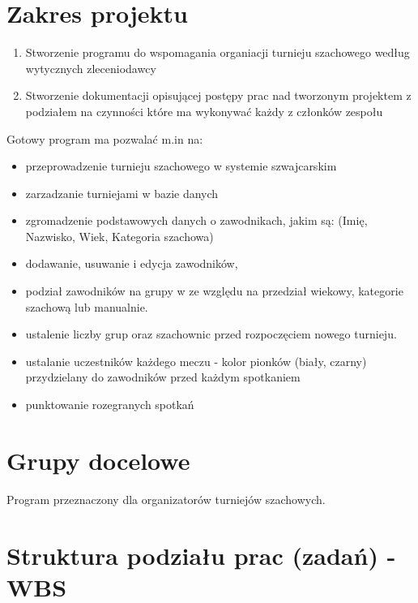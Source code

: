 \section{Zakres projektu}
\begin{enumerate}
	\item Stworzenie programu do wspomagania organiacji turnieju szachowego według wytycznych zleceniodawcy
	\item Stworzenie dokumentacji opisującej postępy prac nad tworzonym projektem z podziałem na czynności które ma wykonywać każdy z członków zespołu
\end{enumerate}
Gotowy program ma pozwalać m.in na:
\begin{itemize}
	\item  przeprowadzenie turnieju szachowego w systemie szwajcarskim 
	\item zarzadzanie turniejami w bazie danych 
	\item zgromadzenie podstawowych danych o zawodnikach, jakim są: (Imię, Nazwisko, Wiek, Kategoria szachowa) 
	\item dodawanie, usuwanie i edycja zawodników, 
	\item podział zawodników na grupy w ze względu na przedział wiekowy, kategorie szachową lub manualnie. 
	\item ustalenie liczby grup oraz szachownic przed rozpoczęciem nowego turnieju. 
	\item ustalanie uczestników każdego meczu - kolor pionków (biały, czarny) przydzielany do zawodników przed każdym spotkaniem 
	\item punktowanie rozegranych spotkań
\end{itemize}


\section{Grupy docelowe}
Program przeznaczony dla organizatorów turniejów szachowych.  


\section{Struktura podziału prac (zadań) - WBS}

